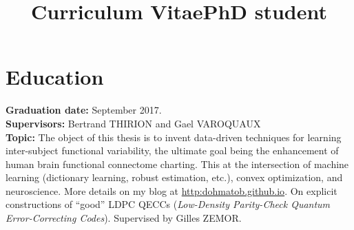 \documentclass[11pt,a4paper,roman,unicode]{moderncv}
\title{Curriculum Vitae}
\title{PhD student}
\begin{document}
\maketitle
\section{Education}
        {
          \textbf{Graduation date:} September 2017.\\
          \textbf{Supervisors:} Bertrand THIRION and Gael VAROQUAUX\\
          \textbf{Topic:} The object of this thesis is to invent data-driven techniques for learning inter-subject functional variability, the ultimate goal being the enhancement of human brain functional connectome charting. This at the intersection of machine learning (dictionary learning, robust estimation, etc.), convex optimization, 
          and neuroscience. More details on my blog at \url{http:dohmatob.github.io}.}
{On explicit constructions of ``good'' LDPC QECCs (\emph{Low-Density Parity-Check Quantum Error-Correcting Codes}). Supervised by Gilles ZEMOR.}
{}
\end{document}
